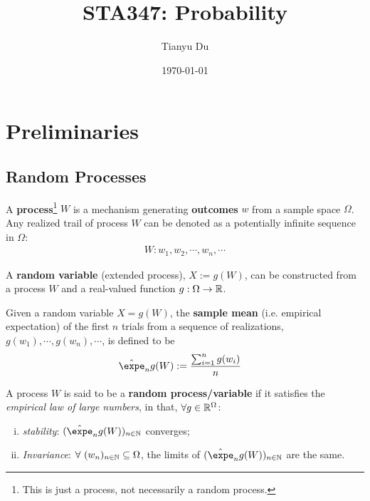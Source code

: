 \documentclass{article}
\title{STA347: Probability}
\date{\today}
\author{Tianyu Du}
\begin{document}
    \maketitle
    \tableofcontents
    \newpage
   	\section{Preliminaries}
   	\subsection{Random Processes}
   	\begin{definition}
   		A \textbf{process}\footnote{This is just a process, not necessarily a random process.} $W$ is a mechanism generating \textbf{outcomes} $w$ from a sample space $\Omega$. Any realized trail of process $W$ can be denoted as a potentially infinite sequence in $\Omega$:
   		\begin{align}
   			W: w_1, w_2, \cdots, w_n, \cdots
   		\end{align}
   	\end{definition}
   	
   	\begin{definition}
   		A \textbf{random variable} (extended process), $X := g(W)$, can be constructed from a process $W$ and a real-valued function $g: \Omega \to \mathbb{R}$.
   	\end{definition}
   	
   	\begin{definition}
   		Given a random variable $X = g(W)$, the \textbf{sample mean} (i.e. empirical expectation) of the first $n$ trials from a sequence of realizations, $g(w_1), \cdots, g(w_n), \cdots$, is defined to be
   		\begin{align}
   			\hat{\expe}_n g(W) &:= \frac{\sum_{i=1}^n g(w_i)}{n}
   		\end{align}
   	\end{definition}
   	
   	\begin{definition}
   		A process $W$ is said to be a \textbf{random process/variable} if it satisfies the \emph{empirical law of large numbers}, in that, $\forall g \in \mathbb{R}^\Omega$:
   		\begin{enumerate}[(i)]
   			\item \emph{stability}: $(\hat{\expe}_ng(W))_{n\in \N}$ converges;
   			\item \emph{Invariance}: $\forall\ (w_n)_{n \in \mathbb{N}} \subseteq \Omega$, the limits of $(\hat{\expe}_ng(W))_{n\in \N}$ are the same.
   		\end{enumerate}
   	\end{definition}
   	
\end{document}

